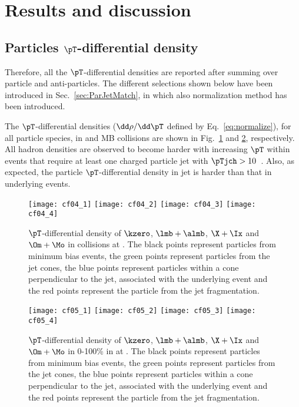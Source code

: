 \documentclass[ALICE,manyauthors]{cernphprep}
\begin{document}
\section{Results and discussion}%
\label{sec:Results}

\subsection{Particles $\pT$-differential density}
\label{subsec:ParPtDensity}

Therefore, all the $\pT$-differential densities are reported after summing over particle and anti-particles.
The different selections shown below have been introduced in Sec.~\ref{sec:ParJetMatch}, in which also normalization method has been introduced.

The $\pT$-differential densities ($\dd \rho/ \dd \pT$ defined by Eq.~\ref{eq:normalize}), for all particle species, in \pp and MB \pPb collisions are shown in Fig.~\ref{fig:ppSpect} and \ref{fig:pPbSpect}, respectively.
All hadron densities are observed to become harder with increasing $\pT$ within events that require at least one charged particle jet with $\pTjch > 10$~\GeVc.
Also, as expected, the particle $\pT$-differential density in jet is harder than that in underlying events.

\begin{figure}[!ht]
	\begin{center}
		\texttt{[image: cf04\_1]}
		\texttt{[image: cf04\_2]}
		\texttt{[image: cf04\_3]}
		\texttt{[image: cf04\_4]}
	\end{center}
	\caption{$\pT$-differential density of $\kzero$, $\lmb + \almb$, $\X + \Ix$ and $\Om + \Mo$ in \pp collisions at \thirteen. The black points represent particles from minimum bias events, the green points represent particles from the jet cones, the blue points represent particles within a cone perpendicular to the jet, associated with the underlying event and the red points represent the particle from the jet fragmentation.}
	\label{fig:ppSpect}
\end{figure}
\begin{figure}[!ht]
	\begin{center}
		\texttt{[image: cf05\_1]}
		\texttt{[image: cf05\_2]}
		\texttt{[image: cf05\_3]}
		\texttt{[image: cf05\_4]}
	\end{center}
	\caption{$\pT$-differential density of $\kzero$, $\lmb + \almb$, $\X + \Ix$ and $\Om + \Mo$ in 0-100\% in \pPb at \fivenn. The black points represent particles from minimum bias events, the green points represent particles from the jet cones, the blue points represent particles within a cone perpendicular to the jet, associated with the underlying event and the red points represent the particle from the jet fragmentation.}
	\label{fig:pPbSpect}
\end{figure}
\end{document}
